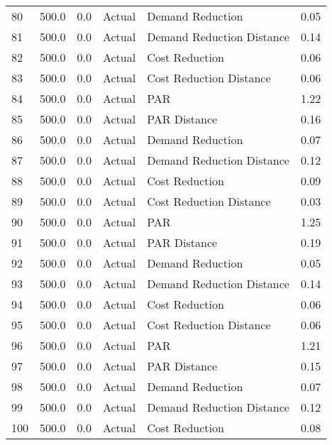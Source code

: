 \begin{longtable}{lrrllr}
80   &        500.0 &     0.0 &         Actual &           Demand Reduction &   0.05 \\
81   &        500.0 &     0.0 &         Actual &  Demand Reduction Distance &   0.14 \\
82   &        500.0 &     0.0 &         Actual &             Cost Reduction &   0.06 \\
83   &        500.0 &     0.0 &         Actual &    Cost Reduction Distance &   0.06 \\
84   &        500.0 &     0.0 &         Actual &                        PAR &   1.22 \\
85   &        500.0 &     0.0 &         Actual &               PAR Distance &   0.16 \\
86   &        500.0 &     0.0 &         Actual &           Demand Reduction &   0.07 \\
87   &        500.0 &     0.0 &         Actual &  Demand Reduction Distance &   0.12 \\
88   &        500.0 &     0.0 &         Actual &             Cost Reduction &   0.09 \\
89   &        500.0 &     0.0 &         Actual &    Cost Reduction Distance &   0.03 \\
90   &        500.0 &     0.0 &         Actual &                        PAR &   1.25 \\
91   &        500.0 &     0.0 &         Actual &               PAR Distance &   0.19 \\
92   &        500.0 &     0.0 &         Actual &           Demand Reduction &   0.05 \\
93   &        500.0 &     0.0 &         Actual &  Demand Reduction Distance &   0.14 \\
94   &        500.0 &     0.0 &         Actual &             Cost Reduction &   0.06 \\
95   &        500.0 &     0.0 &         Actual &    Cost Reduction Distance &   0.06 \\
96   &        500.0 &     0.0 &         Actual &                        PAR &   1.21 \\
97   &        500.0 &     0.0 &         Actual &               PAR Distance &   0.15 \\
98   &        500.0 &     0.0 &         Actual &           Demand Reduction &   0.07 \\
99   &        500.0 &     0.0 &         Actual &  Demand Reduction Distance &   0.12 \\
100  &        500.0 &     0.0 &         Actual &             Cost Reduction &   0.08 \\

\end{longtable}
